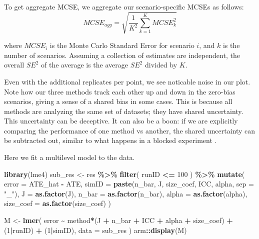 \documentclass[
]{book}
\newenvironment{Shaded}{\begin{snugshade}}{\end{snugshade}}
\newcommand{\AttributeTok}[1]{\textcolor[rgb]{0.13,0.29,0.53}{#1}}
\newcommand{\DecValTok}[1]{\textcolor[rgb]{0.00,0.00,0.81}{#1}}
\newcommand{\FunctionTok}[1]{\textcolor[rgb]{0.13,0.29,0.53}{\textbf{#1}}}
\newcommand{\NormalTok}[1]{#1}
\newcommand{\OtherTok}[1]{\textcolor[rgb]{0.56,0.35,0.01}{#1}}
\newcommand{\SpecialCharTok}[1]{\textcolor[rgb]{0.81,0.36,0.00}{\textbf{#1}}}
\newcommand{\StringTok}[1]{\textcolor[rgb]{0.31,0.60,0.02}{#1}}
\begin{document}
To get aggregate MCSE, we aggregate our scenario-specific MCSEs as follows:
\[ MCSE_{agg} = \sqrt{ \frac{1}{K^2} \sum_{k=1}^{K} MCSE_k^2 } \]

where \(MCSE_i\) is the Monte Carlo Standard Error for scenario \(i\), and \(k\) is the number of scenarios.
Assuming a collection of estimates are independent, the overall \(SE^2\) of the average is the average \(SE^2\) divided by \(K\).

Even with the additional replicates per point, we see noticable noise in our plot.
Note how our three methods track each other up and down in the zero-bias scenarios, giving a sense of a shared bias in some cases.
This is because all methods are analyzing the same set of datasets; they have shared uncertainty.
This uncertainty can be deceptive.
It can also be a boon: if we are explicitly comparing the performance of one method vs another, the shared uncertainty can be subtracted out, similar to what happens in a blocked experiment \citep{gilbert2024multilevel}.

Here we fit a multilevel model to the data.

\begin{Shaded}
\begin{Highlighting}[]
\FunctionTok{library}\NormalTok{(lme4)}
\NormalTok{sub\_res }\OtherTok{\textless{}{-}}
\NormalTok{  res }\SpecialCharTok{\%\textgreater{}\%} 
  \FunctionTok{filter}\NormalTok{( runID }\SpecialCharTok{\textless{}=} \DecValTok{100}\NormalTok{ ) }\SpecialCharTok{\%\textgreater{}\%}
  \FunctionTok{mutate}\NormalTok{(}
    \AttributeTok{error =}\NormalTok{ ATE\_hat }\SpecialCharTok{{-}}\NormalTok{ ATE,}
    \AttributeTok{simID =} \FunctionTok{paste}\NormalTok{(n\_bar, J, size\_coef, ICC, alpha, }\AttributeTok{sep =} \StringTok{"\_"}\NormalTok{),}
    \AttributeTok{J =} \FunctionTok{as.factor}\NormalTok{(J),}
    \AttributeTok{n\_bar =} \FunctionTok{as.factor}\NormalTok{(n\_bar),}
    \AttributeTok{alpha =} \FunctionTok{as.factor}\NormalTok{(alpha),}
    \AttributeTok{size\_coef =} \FunctionTok{as.factor}\NormalTok{(size\_coef)}
\NormalTok{  )}

\NormalTok{M }\OtherTok{\textless{}{-}} \FunctionTok{lmer}\NormalTok{( }
\NormalTok{  error }\SpecialCharTok{\textasciitilde{}}\NormalTok{ method}\SpecialCharTok{*}\NormalTok{(J }\SpecialCharTok{+}\NormalTok{ n\_bar }\SpecialCharTok{+}\NormalTok{ ICC }\SpecialCharTok{+}\NormalTok{ alpha }\SpecialCharTok{+}\NormalTok{ size\_coef) }\SpecialCharTok{+}\NormalTok{ (}\DecValTok{1}\SpecialCharTok{|}\NormalTok{runID) }\SpecialCharTok{+}\NormalTok{ (}\DecValTok{1}\SpecialCharTok{|}\NormalTok{simID),}
  \AttributeTok{data =}\NormalTok{ sub\_res }
\NormalTok{)}
\NormalTok{arm}\SpecialCharTok{::}\FunctionTok{display}\NormalTok{(M)}
\end{Highlighting}
\end{Shaded}
\end{document}
